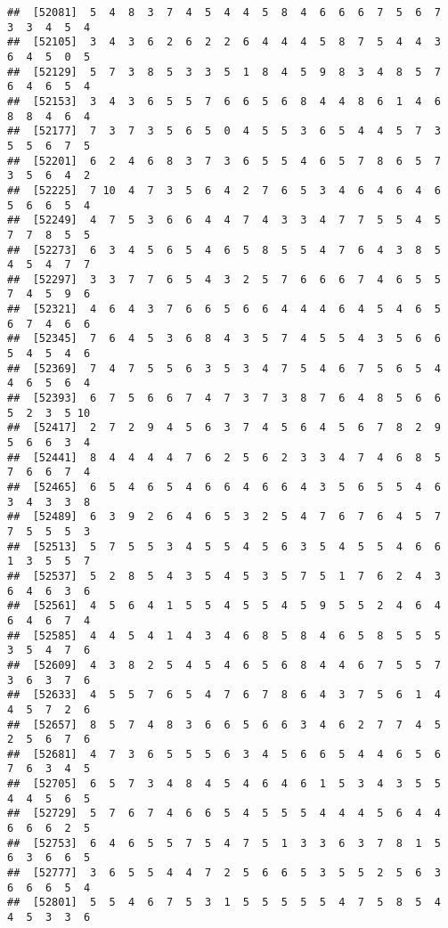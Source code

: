 \documentclass[
]{book}
\begin{document}
\begin{verbatim}
##  [52081]  5  4  8  3  7  4  5  4  4  5  8  4  6  6  6  7  5  6  7  3  3  4  5  4
##  [52105]  3  4  3  6  2  6  2  2  6  4  4  4  5  8  7  5  4  4  3  6  4  5  0  5
##  [52129]  5  7  3  8  5  3  3  5  1  8  4  5  9  8  3  4  8  5  7  6  4  6  5  4
##  [52153]  3  4  3  6  5  5  7  6  6  5  6  8  4  4  8  6  1  4  6  8  8  4  6  4
##  [52177]  7  3  7  3  5  6  5  0  4  5  5  3  6  5  4  4  5  7  3  5  5  6  7  5
##  [52201]  6  2  4  6  8  3  7  3  6  5  5  4  6  5  7  8  6  5  7  3  5  6  4  2
##  [52225]  7 10  4  7  3  5  6  4  2  7  6  5  3  4  6  4  6  4  6  5  6  6  5  4
##  [52249]  4  7  5  3  6  6  4  4  7  4  3  3  4  7  7  5  5  4  5  7  7  8  5  5
##  [52273]  6  3  4  5  6  5  4  6  5  8  5  5  4  7  6  4  3  8  5  4  5  4  7  7
##  [52297]  3  3  7  7  6  5  4  3  2  5  7  6  6  6  7  4  6  5  5  7  4  5  9  6
##  [52321]  4  6  4  3  7  6  6  5  6  6  4  4  4  6  4  5  4  6  5  6  7  4  6  6
##  [52345]  7  6  4  5  3  6  8  4  3  5  7  4  5  5  4  3  5  6  6  5  4  5  4  6
##  [52369]  7  4  7  5  5  6  3  5  3  4  7  5  4  6  7  5  6  5  4  4  6  5  6  4
##  [52393]  6  7  5  6  6  7  4  7  3  7  3  8  7  6  4  8  5  6  6  5  2  3  5 10
##  [52417]  2  7  2  9  4  5  6  3  7  4  5  6  4  5  6  7  8  2  9  5  6  6  3  4
##  [52441]  8  4  4  4  4  7  6  2  5  6  2  3  3  4  7  4  6  8  5  7  6  6  7  4
##  [52465]  6  5  4  6  5  4  6  6  4  6  6  4  3  5  6  5  5  4  6  3  4  3  3  8
##  [52489]  6  3  9  2  6  4  6  5  3  2  5  4  7  6  7  6  4  5  7  7  5  5  5  3
##  [52513]  5  7  5  5  3  4  5  5  4  5  6  3  5  4  5  5  4  6  6  1  3  5  5  7
##  [52537]  5  2  8  5  4  3  5  4  5  3  5  7  5  1  7  6  2  4  3  6  4  6  3  6
##  [52561]  4  5  6  4  1  5  5  4  5  5  4  5  9  5  5  2  4  6  4  6  4  6  7  4
##  [52585]  4  4  5  4  1  4  3  4  6  8  5  8  4  6  5  8  5  5  5  3  5  4  7  6
##  [52609]  4  3  8  2  5  4  5  4  6  5  6  8  4  4  6  7  5  5  7  3  6  3  7  6
##  [52633]  4  5  5  7  6  5  4  7  6  7  8  6  4  3  7  5  6  1  4  4  5  7  2  6
##  [52657]  8  5  7  4  8  3  6  6  5  6  6  3  4  6  2  7  7  4  5  2  5  6  7  6
##  [52681]  4  7  3  6  5  5  5  6  3  4  5  6  6  5  4  4  6  5  6  7  6  3  4  5
##  [52705]  6  5  7  3  4  8  4  5  4  6  4  6  1  5  3  4  3  5  5  4  4  5  6  5
##  [52729]  5  7  6  7  4  6  6  5  4  5  5  5  4  4  4  5  6  4  4  6  6  6  2  5
##  [52753]  6  4  6  5  5  7  5  4  7  5  1  3  3  6  3  7  8  1  5  6  3  6  6  5
##  [52777]  3  6  5  5  4  4  7  2  5  6  6  5  3  5  5  2  5  6  3  6  6  6  5  4
##  [52801]  5  5  4  6  7  5  3  1  5  5  5  5  5  4  7  5  8  5  4  4  5  3  3  6

\end{verbatim}
\end{document}
